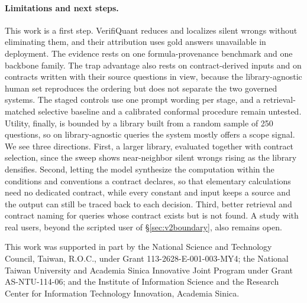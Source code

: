\documentclass[sigconf]{acmart}
\newif\ifarxiv
\begin{document}
\paragraph{Limitations and next steps.}
This work is a first step. VerifiQuant reduces and localizes silent wrongs without eliminating them, and their attribution uses gold answers unavailable in deployment. The evidence rests on one formula-provenance benchmark and one backbone family. The trap advantage also rests on contract-derived inputs and on contracts written with their source questions in view, because the library-agnostic human set reproduces the ordering but does not separate the two governed systems. The staged controls use one prompt wording per stage, and a retrieval-matched selective baseline and a calibrated conformal procedure remain untested. Utility, finally, is bounded by a library built from a random sample of 250 questions, so on library-agnostic queries the system mostly offers a scope signal. We see three directions. First, a larger library, evaluated together with contract selection, since the sweep shows near-neighbor silent wrongs rising as the library densifies. Second, letting the model synthesize the computation within the conditions and conventions a contract declares, so that elementary calculations need no dedicated contract, while every constant and input keeps a source and the output can still be traced back to each decision. Third, better retrieval and contract naming for queries whose contract exists but is not found. A study with real users, beyond the scripted user of \S\ref{sec:v2boundary}, also remains open.

\begin{acks}
This work was supported in part by the National Science and Technology Council, Taiwan, R.O.C., under Grant 113-2628-E-001-003-MY4; the National Taiwan University and Academia Sinica Innovative Joint Program under Grant AS-NTU-114-06; and the Institute of Information Science and the Research Center for Information Technology Innovation, Academia Sinica.
\end{acks}



\ifarxiv
\balance
\clearpage
\nobalance
\appendix

\fi
\end{document}
